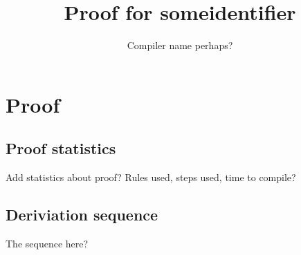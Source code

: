 \documentclass{article}
\begin{document}
\title{Proof for someidentifier}
\author{Compiler name perhaps?}

\maketitle

\section{Proof}
\subsection{Proof statistics}
Add statistics about proof? Rules used, steps used, time to compile?

\subsection{Deriviation sequence}
The sequence here?
\end{document}
